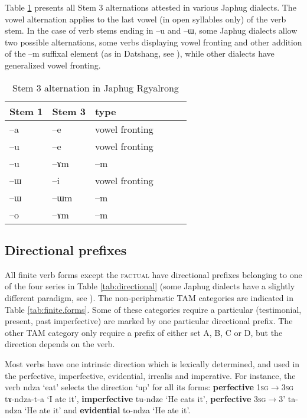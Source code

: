 \documentclass[oldfontcommands,oneside,a4paper,11pt]{article}
\newcommand{\ipa}[1]{{\phon #1}} %
\begin{document}
Table \ref{tab:stem3} presents all Stem 3 alternations attested in various Japhug dialects. The vowel alternation applies to the last vowel (in open syllables only) of the verb stem. In the case of verb stems ending in  \ipa{--u} and  \ipa{--ɯ}, some Japhug dialects allow two possible alternations, some verbs displaying vowel fronting and other addition of the \ipa{--m} suffixal element (as in Datshang, see \citealt{linluo03}), while other dialects have generalized vowel fronting.

 \begin{table} 
\caption{Stem 3 alternation in Japhug Rgyalrong} \label{tab:stem3} \centering
\begin{tabular}{llllll}
\toprule
Stem 1 & Stem 3& type \\
\midrule
 \ipa{--a} & \ipa{--e} & vowel fronting\\
 \ipa{--u} & \ipa{--e} & vowel fronting\\
\ipa{--u} & \ipa{--ɤm} & \ipa{--m} \\
\ipa{--ɯ} & \ipa{--i} & vowel fronting\\
\ipa{--ɯ} & \ipa{--ɯm} & \ipa{--m}\\
\ipa{--o} & \ipa{--ɤm} & \ipa{--m} \\
\bottomrule
\end{tabular}
\end{table}




\subsection{Directional prefixes}
All finite verb forms except the \textsc{factual} have directional prefixes belonging to one of the four series in Table \ref{tab:directional} (some Japhug dialects have a slightly different paradigm, see \citealt{linluo03}). The non-periphrastic TAM categories are indicated in Table \ref{tab:finite.forms}. Some of these categories require a particular (testimonial, present, past imperfective) are marked by one particular directional prefix. The other TAM category only require a prefix of either set A, B, C or D, but the direction depends on the verb.

Most verbs have one intrinsic direction which is lexically determined, and used in the perfective, imperfective, evidential, irrealis and imperative. For instance, the verb \ipa{ndza} `eat' selects the direction `up' for all its forms: \textbf{perfective} \textsc{1sg$\rightarrow$3sg} \ipa{tɤ-ndza-t-a} `I ate it', \textbf{imperfective} \ipa{tu-ndze} `He eats it', \textbf{perfective} \textsc{3sg$\rightarrow$3'} \ipa{ta-ndza} `He ate it' and \textbf{evidential} \ipa{to-ndza} `He ate it'. 
\end{document}
